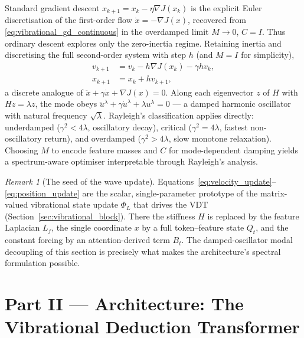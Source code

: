 \documentclass[12pt,a4paper]{article}
\theoremstyle{plain}
\theoremstyle{definition}
\theoremstyle{remark}
\newtheorem{remark}[theorem]{Remark}
\newcommand{\1}{\mathbf{1}}
\newcommand{\VDT}{\textsc{VDT}}
\begin{document}
Standard gradient descent $x_{k+1} = x_k - \eta \nabla J(x_k)$ is the
explicit Euler discretisation of the first-order flow
$\dot x = -\nabla J(x)$, recovered from
\eqref{eq:vibrational_gd_continuous} in the overdamped limit
$M \to 0$, $C = I$. Thus ordinary descent explores only the zero-inertia
regime. Retaining inertia and discretising the full second-order system
with step $h$ (and $M=I$ for simplicity),
\begin{align}
    v_{k+1} &= v_k - h \nabla J(x_k) - \gamma h v_k, \label{eq:velocity_update}\\
    x_{k+1} &= x_k + h v_{k+1}, \label{eq:position_update}
\end{align}
a discrete analogue of $\ddot x + \gamma \dot x + \nabla J(x) = 0$. Along
each eigenvector $z$ of $H$ with $Hz = \lambda z$, the mode obeys
$\ddot u^\lambda + \gamma \dot u^\lambda + \lambda u^\lambda = 0$ --- a
damped harmonic oscillator with natural frequency $\sqrt{\lambda}$.
Rayleigh's classification applies directly: underdamped
($\gamma^2 < 4\lambda$, oscillatory decay), critical
($\gamma^2 = 4\lambda$, fastest non-oscillatory return), and overdamped
($\gamma^2 > 4\lambda$, slow monotone relaxation). Choosing $M$ to encode
feature masses and $C$ for mode-dependent damping yields a
spectrum-aware optimiser interpretable through Rayleigh's analysis.

\begin{remark}[The seed of the wave update]
\label{rem:seed}
Equations~\eqref{eq:velocity_update}--\eqref{eq:position_update} are the
scalar, single-parameter prototype of the matrix-valued vibrational
state update $\Phi_L$ that drives the \VDT{}
(Section~\ref{sec:vibrational_block}). There the stiffness $H$ is
replaced by the feature Laplacian $L_f$, the single coordinate $x$ by a
full token--feature state $Q_t$, and the constant forcing by an
attention-derived term $B_t$. The damped-oscillator modal decoupling of
this section is precisely what makes the architecture's spectral
formulation possible.
\end{remark}

\part*{Part II --- Architecture: The Vibrational Deduction Transformer}

\end{document}
